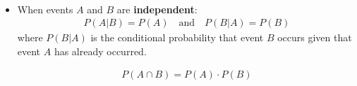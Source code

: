 \documentclass[Main.tex]{subfiles}
\begin{document}
	\begin{exercise} \hfill \\
		\begin{itemize}	
			\item When events $A$ and $B$ are \textbf{independent}:
			\begin{subequations}
				\begin{align}
					P(A|B)=P(A)\quad\text{and}\quad P(B|A)=P(B)
				\end{align}
			\end{subequations}	
			where $P(B|A)$ is the conditional probability that event $B$ occurs given that event $A$ has already occurred.\\
			\begin{definition}
				\begin{subequations}
					\begin{align}
						P(A\cap B)=P(A)\cdot P(B)
					\end{align}
				\end{subequations}	
			\end{definition} \hfill					
		\end{itemize}
	\end{exercise}
	
\end{document}
